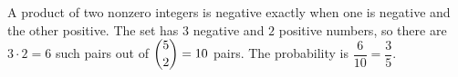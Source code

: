 A product of two nonzero integers is negative exactly when one is negative and the other positive. The set has $3$ negative and $2$ positive numbers, so there are $3\cdot2=6$ such pairs out of $\dbinom52=10$ pairs. The probability is $\dfrac{6}{10}=\boxed{\dfrac{3}{5}}$.
